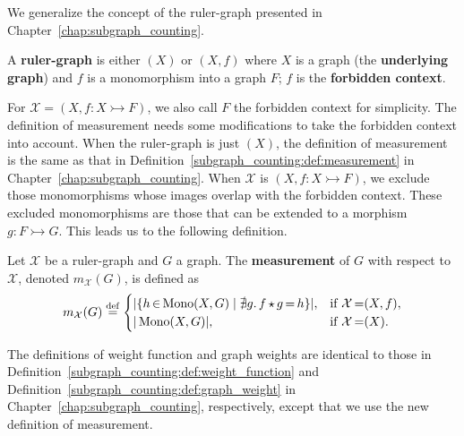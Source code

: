 We generalize the concept of the ruler-graph presented in Chapter~\ref{chap:subgraph_counting}.

\begin{definition}
    \label{antipattern:def:ruler_graph}
    A \textbf{ruler-graph} is either $(X)$ or \( (X, f) \) where $X$ is a graph (the \textbf{underlying graph}) and $f$ is a monomorphism into a graph $F$; $f$ is the \textbf{forbidden context}.
\end{definition}
For $\mathcal{X} \mathop{=} (X, f:X \rightarrowtail F)$, we also call $F$ the forbidden context for simplicity.
The definition of measurement needs some modifications to take the forbidden context into account. When the ruler-graph is just $(X)$, the definition of measurement is the same as that in Definition~\ref{subgraph_counting:def:measurement} in Chapter~\ref{chap:subgraph_counting}. When $\mathcal{X}$ is $(X, f:X \rightarrowtail F)$, we exclude those monomorphisms whose images overlap with the forbidden context. These excluded monomorphisms are those that can be extended to a morphism $g: F \rightarrowtail G$. This leads us to the following definition.
\begin{definition} 
    \label{antipattern:def:measurement}
    Let \( \mathcal{X}\) be a ruler-graph and \( G \) a graph. The \textbf{measurement} of \( G \) with respect to \( \mathcal{X}\), denoted \( m_\mathcal{X}(G) \), is defined as 
    \[
        m_\mathcal{X}(G) \overset{\operatorname{def}}{=}
        \begin{cases}
            |\{h \mathop{\in} \operatorname{Mono}(X,G) \mid \nexists g.\,f \mathop{\star} g \mathop{=} h \}|, & \text{if } \mathcal{X} \mathop{=} (X, f), \\
            |\operatorname{Mono}(X,G)|, & \text{if } \mathcal{X} \mathop{=} (X).
        \end{cases}
    \]
\end{definition}
The definitions of weight function and graph weights are identical to those in Definition~\ref{subgraph_counting:def:weight_function} and Definition~\ref{subgraph_counting:def:graph_weight} in Chapter~\ref{chap:subgraph_counting}, respectively, except that we use the new definition of measurement.